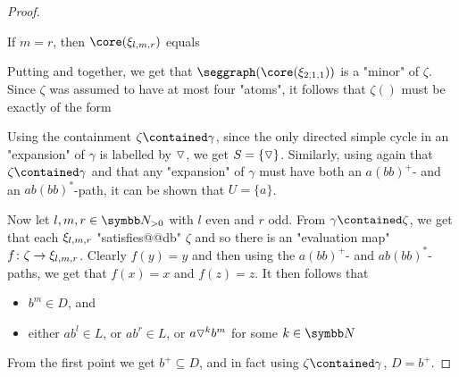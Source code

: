 \begin{proof}
	\begin{claim}
		\AP\label{claim:example-union-matter-2}
		If $m=r$, then $\core(\anexpansion_{l,m,r})$ equals
		\begin{center}
			\small
		\end{center}
	\end{claim}
	Putting  and
	 together, we get that 
	$\seggraph(\core(\anexpansion_{2,1,1}))$ is a "minor" of $\zeta$.
	Since $\zeta$ was assumed to have at most four "atoms",
	it follows that $\zeta()$ must be exactly of the form
	\begin{center}
	\end{center}
	Using the containment $\zeta \contained \gamma$,
	since the only directed simple cycle in an "expansion" of $\gamma$ is labelled
	by $\triangledown$, we get $S = \{\triangledown\}$.
	Similarly, using again that $\zeta \contained \gamma$ and that any "expansion" of $\gamma$
	must have both an $a(bb)^+$- and an $ab(bb)^*$-path, it can be shown that $U = \{a\}$.

	Now let $l,m,r \in \Np$ with $l$ even and $r$ odd.
	From $\gamma \contained \zeta$, we get that each $\xi_{l,m,r}$ "satisfies@@db"
	$\zeta$ and so there is an "evaluation map" $f\colon \zeta \to \xi_{l,m,r}$.
	Clearly $f(y) = y$ and then using the
	$a(bb)^+$- and $ab(bb)^*$-paths, we get that $f(x) = x$ and $f(z) = z$. 
	It then follows that
	\begin{itemize}
		\item $b^m \in D$, and
		\item either $ab^l \in L$, or $ab^r \in L$, or $a \triangledown^k b^m$ for some $k\in\N$
	\end{itemize}
	From the first point we get $b^+ \subseteq D$, and in fact using $\zeta\contained \gamma$,
	$D = b^+$.


\end{proof}
